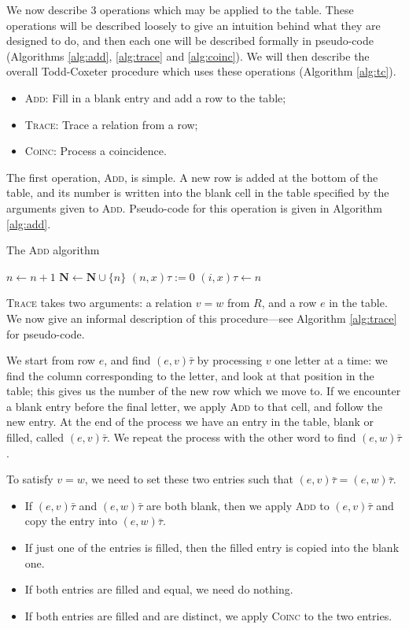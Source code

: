 We now describe 3 operations which may be applied to the table.  These
operations will be described loosely to give an intuition behind what they are
designed to do, and then each one will be described formally in pseudo-code
(Algorithms \ref{alg:add}, \ref{alg:trace} and \ref{alg:coinc}).  We will then
describe the overall Todd-Coxeter procedure which uses these operations
(Algorithm \ref{alg:tc}).

\begin{itemize}
\item \textsc{Add}: Fill in a blank entry and add a row to the table;
\item \textsc{Trace}: Trace a relation from a row;
\item \textsc{Coinc}: Process a coincidence.
\end{itemize}

The first operation, \textsc{Add}, is simple.  A new row is added at the bottom
of the table, and its number is written into the blank cell in the table
specified by the arguments given to \textsc{Add}.  Pseudo-code for this
operation is given in Algorithm \ref{alg:add}.

\begin{algorithm}
\caption{The \textsc{Add} algorithm}
\label{alg:add}
\begin{algorithmic}[1]
\State $n \gets n + 1$
\State $\mathbf{N} \gets \mathbf{N} \cup \{n\}$
  \State $(n, x)\tau := 0$
\EndFor
\State $(i, x)\tau \gets n$
\EndProcedure
\end{algorithmic}
\end{algorithm}

\textsc{Trace} takes two arguments: a relation $v=w$ from $R$, and a row $e$
in the table.  We now give an informal description of this procedure---see
Algorithm \ref{alg:trace} for pseudo-code.

We start from row $e$, and find $(e, v)\bar\tau$ by processing $v$ one letter at a time: we
find the column corresponding to the letter, and look at that position in the
table; this gives us the number of the new row which we move to.  If we
encounter a blank entry before the final letter, we apply \textsc{Add} to that
cell, and follow the new entry.  At the end of the process we have an entry in
the table, blank or filled, called $(e, v)\bar\tau$.  We repeat the
process with the other word to find $(e, w)\bar\tau$.

To satisfy $v=w$, we need to set these two entries such that
$(e, v)\bar\tau = (e, w)\bar\tau$.
\begin{itemize}
\item If $(e, v)\bar\tau$ and $(e, w)\bar\tau$ are both blank, then we apply
  \textsc{Add} to $(e, v)\bar\tau$ and copy the entry into $(e, w)\bar\tau$.
\item If just one of the entries is filled, then the filled entry is copied into
  the blank one.
\item If both entries are filled and equal, we need do nothing.
\item If both entries are filled and are distinct, we apply \textsc{Coinc} to
  the two entries.
\end{itemize}

